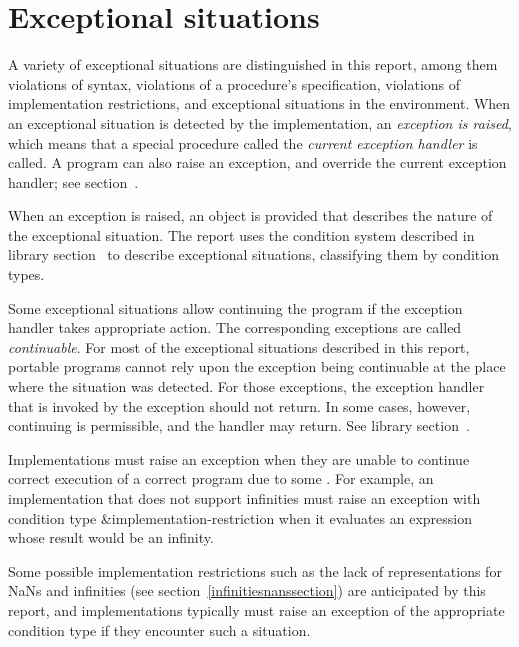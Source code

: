 \section{Exceptional situations}
\label{exceptionalsituationsection}

A variety of exceptional situations
are distinguished in this report, among them violations of syntax,
violations of a procedure's specification, violations of
implementation restrictions, and exceptional situations in the
environment.  When an exceptional situation is detected by the
implementation, an \textit{exception is raised},
which means that a special procedure called the \textit{current
  exception handler} is called.  A program can also raise an
exception, and override the current exception handler; see
section~.

When an exception is raised, an object is provided that
describes the nature of the exceptional situation.  The report uses
the condition system described in library section~ to
describe exceptional situations, classifying them by condition types.

Some exceptional situations allow continuing the program if the
exception handler takes appropriate action.  The corresponding
exceptions are called \textit{continuable}.
For most of the exceptional situations described in this report,
portable programs cannot rely upon the exception being continuable
at the place where the situation was detected.
For those exceptions, the exception handler that is invoked by the
exception should not return.
In some cases, however, continuing is permissible, and the
handler may return.  See library section~.

Implementations must raise an exception
when they are unable to continue correct execution
of a correct program due to some .  For
example, an implementation that does not support infinities
must raise an exception with condition type
{\cf\&implementation-restriction} when it evaluates an expression
whose result would be an infinity.

Some possible implementation restrictions such as the lack of
representations for NaNs and infinities (see
section~\ref{infinitiesnanssection}) are anticipated by this report,
and implementations typically must raise an exception of the
appropriate condition type if they encounter such a situation.

